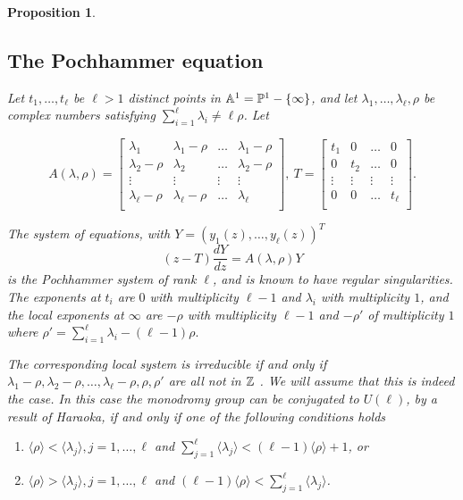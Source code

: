 \documentclass[11pt]{amsart}
\newtheorem{proposition}[theorem]{Proposition}
\numberwithin{theorem}{subsection}
\begin{document}
{\begin{proposition}
\subsection{The Pochhammer equation}\label{pokhie}
Let $t_1,\dots,t_{\ell}$ be $\ell>1$ distinct points in $\Bbb{A}^1=\Bbb{P}^1-\{\infty\}$, and let $\lambda_1,\dots,\lambda_{\ell},\rho$ be complex numbers
satisfying $\sum_{i=1}^{\ell}\lambda_i\neq \ell\rho$. Let

$$A(\lambda,\rho)=
  \left[ {\begin{array}{cccc}
   \lambda_1 & \lambda_1-\rho & \dots & \lambda_1-\rho \\
   \lambda_2-\rho & \lambda_2 &\dots  & \lambda_2-\rho\\
   \vdots & \vdots &\vdots & \vdots \\
   \lambda_{\ell}-\rho & \lambda_{\ell}-\rho & \dots & \lambda_{\ell}\\
\end{array} }\right],\  T= \left[ {\begin{array}{cccc}
   t_1 & 0 & \dots & 0 \\
   0 & t_2 &\dots  & 0\\
   \vdots & \vdots &\vdots & \vdots \\
   0 & 0 & \dots & t_{\ell}\\\end{array} }\right].$$

The system of equations, with $Y=(y_1(z),\dots,y_{\ell}(z))^T$
\begin{equation}\label{math383sys}
(z-T)\frac{dY}{dz}= A(\lambda,\rho)Y
\end{equation}
is the Pochhammer system of rank $\ell$, and is known to have regular singularities. The exponents at $t_i$ are $0$ with multiplicity $\ell-1$ and $\lambda_i$ with multiplicity $1$, and
the local exponents at $\infty$ are $-\rho$ with multiplicity $\ell-1$ and $-\rho'$ of multiplicity $1$ where
$\rho'=\sum_{i=1}^{\ell}\lambda_i -(\ell-1)\rho.$



The corresponding local system is irreducible if and only if
$\lambda_1-\rho,\lambda_2-\rho,\dots,\lambda_{\ell}-\rho,\rho,\rho'$ are all not in $\Bbb{Z}$ \cite[Proposition 1.3]{Haraoka}. We will assume that this is indeed the case. In this case the monodromy group can be conjugated to $U(\ell)$, by a result of Haraoka, if and only if one of the following conditions holds \cite[Proposition 1.5]{Haraoka}
\begin{enumerate}
\item $\langle\rho\rangle <\langle\lambda_j\rangle, j=1,\dots,\ell$ and $\sum_{j=1}^{\ell} \langle\lambda_j\rangle<(\ell-1)\langle\rho\rangle +1$, or
\item $\langle\rho\rangle >\langle\lambda_j\rangle, j=1,\dots,\ell$ and $(\ell-1) \langle\rho\rangle< \sum_{j=1}^{\ell} \langle\lambda_j\rangle$.
\end{enumerate}
\iffalse

\end{proposition}}
\end{document}
